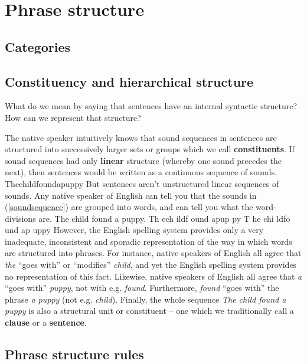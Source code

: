 \chapter{Phrase structure}

\section{Categories}




\section{Constituency and hierarchical structure}

What do we mean by saying that sentences have an internal syntactic structure? How can we represent that structure?

The native speaker intuitively knows that sound sequences in sentences are structured into successively larger sets or groups which we call \textbf{constituents}. If sound sequences had only \textbf{linear} structure (whereby one sound precedes the next), then sentences would be written as a continuous sequence of sounds.
\pex
Thechildfoundapuppy\label{soundsequence}
\xe
But sentences aren't unstructured linear sequences of sounds. Any native speaker of English can tell you that the sounds in (\ref{soundsequence}) are grouped into words, and can tell you what the word-divisions are.
\pex
\a The child found a puppy.
\a \ljudge{*}Th ech ildf ound apup py
\a \ljudge{*}T he chi ldfo und ap uppy
\xe
However, the English spelling system provides only a very inadequate, inconsistent and sporadic representation of the way in which words are structured into phrases. For instance, native speakers of English all agree that \emph{the} ``goes with'' or ``modifies'' \emph{child}, and yet the English spelling system provides no representation of this fact.
\pex
\xe
Likewise, native speakers of English all agree that \emph{a} ``goes with'' \emph{puppy}, not with e.g. \emph{found}.
\pex
\xe
Furthermore, \emph{found} ``goes with'' the phrase \emph{a puppy} (not e.g. \emph{child}).
\pex
\xe
Finally, the whole sequence \emph{The child found a puppy} is also a structural unit or constituent -- one which we traditionally call a \textbf{clause} or a \textbf{sentence}.
\pex
\xe



\section{Phrase structure rules}

